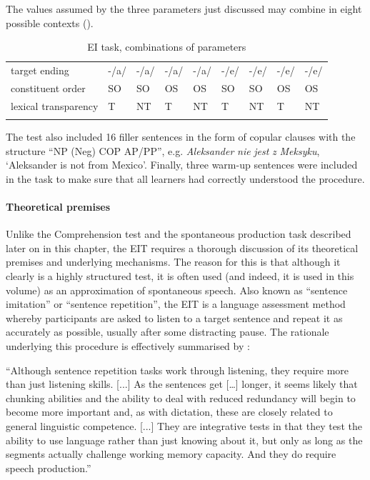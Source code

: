 The values assumed by the three parameters just discussed may combine in eight possible contexts ().

\begin{table}
    \begin{tabularx}{\textwidth}{Xllllllll}
    \lsptoprule
        target ending & {}-/a/ & {}-/a/ & {}-/a/ & {}-/a/ & {}-/e/ & {}-/e/ & {}-/e/ & {}-/e/\\
        constituent order & SO & SO & OS & OS & SO & SO & OS & OS\\
        lexical transparency & T & NT & T & NT & T & NT & T & NT\\
    \lspbottomrule
    \end{tabularx}
    \caption{EI task, combinations of parameters}
    \label{tab:02:13}
\end{table}

The test also included 16 filler sentences in the form of copular clauses with the structure “NP (Neg) COP AP/PP”, e.g. \textit{Aleksander} \textit{nie} \textit{jest} \textit{z} \textit{Meksyku}, ‘Aleksander is not from Mexico’. Finally, three warm-up sentences were included in the task to make sure that all learners had correctly understood the procedure. 

\paragraph{Theoretical premises}

Unlike the Comprehension test and the spontaneous production task described later on in this chapter, the EIT requires a thorough discussion of its theoretical premises and underlying mechanisms. The reason for this is that although it clearly is a highly structured test, it is often used (and indeed, it is used in this volume) as an approximation of spontaneous speech. Also known as “sentence imitation” or “sentence repetition”, the EIT is a language assessment method whereby participants are asked to listen to a target sentence and repeat it as accurately as possible, usually after some distracting pause. The rationale underlying this procedure is effectively summarised by \citet[79]{Buck2001}:

“Although sentence repetition tasks work through listening, they require more than just listening skills. [...] As the sentences get […] longer, it seems likely that chunking abilities and the ability to deal with reduced redundancy will begin to become more important and, as with dictation, these are closely related to general linguistic competence. [...] They are integrative tests in that they test the ability to use language rather than just knowing about it, but only as long as the segments actually challenge working memory capacity. And they do require speech production.”

